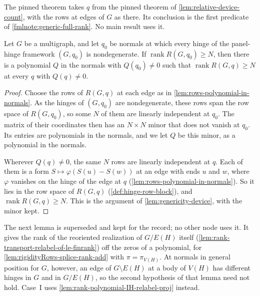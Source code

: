 \begin{fmlnote}
  The pinned theorem takes $q$ from the pinned theorem of
  \cref{lem:relative-device-count}, with the rows at edges of $G$ as
  there. Its conclusion is the first predicate of
  \cref{fmlnote:generic-full-rank}. No main result uses it.
\end{fmlnote}

\begin{lemma}
  \label{lem:rank-polynomial-of-le-finrank}
  \leanok
  Let $G$ be a multigraph, and let $q_0$ be normals at which every hinge
  of the panel-hinge framework $(G,q_0)$ is nondegenerate. If
  $\operatorname{rank} R(G,q_0) \ge N$, then there is a polynomial $Q$ in
  the normals with $Q(q_0) \neq 0$ such that
  $\operatorname{rank} R(G,q) \ge N$ at every $q$ with $Q(q) \neq 0$.
\end{lemma}
\begin{proof}
  \leanok
  Choose the rows of $R(G,q)$ at each edge as in
  \cref{lem:rows-polynomial-in-normals}. As the hinges of $(G,q_0)$ are
  nondegenerate, these rows span the row space of $R(G,q_0)$, so some $N$
  of them are linearly independent at $q_0$. The matrix of their
  coordinates then has an $N \times N$ minor that does not vanish at
  $q_0$. Its entries are polynomials in the normals, and we let $Q$ be
  this minor, as a polynomial in the normals.

  Wherever $Q(q) \neq 0$, the same $N$ rows are linearly independent at
  $q$. Each of them is a form $S \mapsto \varphi(S(u) - S(w))$ at an edge
  with ends $u$ and $w$, where $\varphi$ vanishes on the hinge of the
  edge at $q$ (\cref{lem:rows-polynomial-in-normals}). So it lies in the
  row space of $R(G,q)$ (\cref{def:hinge-row-block}), and
  $\operatorname{rank} R(G,q) \ge N$.
  This is the argument of \cref{lem:genericity-device}, with the minor
  kept.
\end{proof}

The next lemma is superseded and kept for the record; no other node
uses it. It gives the rank of the reoriented realization of $G/E(H)$
itself (\cref{lem:rank-transport-relabel-of-le-finrank}) off the zeros
of a polynomial, for
\cref{lem:rigidityRows-splice-rank-add} with $\pi = \pi_{V(H)}$. At
normals in general position for $G$, however, an edge of
$G \setminus E(H)$ at a body of $V(H)$ has different hinges in $G$ and
in $G/E(H)$, so the second hypothesis of that lemma need not hold.
Case~I uses \cref{lem:rank-polynomial-IH-relabel-proj} instead.

